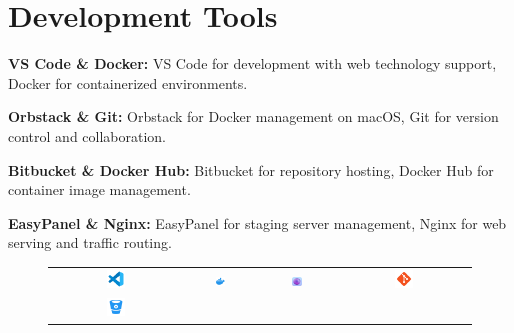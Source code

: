 \section{Development Tools}
\noindent
\textbf{VS Code \& Docker:} VS Code for development with web technology support, Docker for containerized environments.

\textbf{Orbstack \& Git:} Orbstack for Docker management on macOS, Git for version control and collaboration.

\textbf{Bitbucket \& Docker Hub:} Bitbucket for repository hosting, Docker Hub for container image management.

\textbf{EasyPanel \& Nginx:} EasyPanel for staging server management, Nginx for web serving and traffic routing.

\begin{figure}[H]
    \centering
    \begin{tabular}{cccc}
        \includegraphics[width=0.15\textwidth]{images/vscode-logo.png} &
        \includegraphics[width=0.15\textwidth]{images/docker-logo.png} &
        \includegraphics[width=0.15\textwidth]{images/orbstack-logo.png} &
        \includegraphics[width=0.15\textwidth]{images/git-logo.png} \\
        \includegraphics[width=0.15\textwidth]{images/bitbucket-logo.png} &

\end{tabular}
\end{figure}
